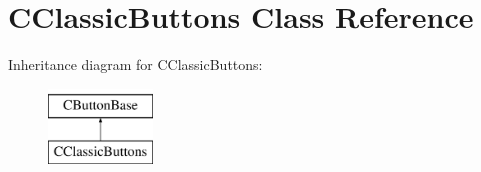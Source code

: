\hypertarget{class_c_classic_buttons}{\section{\-C\-Classic\-Buttons \-Class \-Reference}
\label{class_c_classic_buttons}
}
\-Inheritance diagram for \-C\-Classic\-Buttons\-:\begin{figure}[H]
\begin{center}
\leavevmode
\includegraphics[height=2.000000cm]{class_c_classic_buttons}
\end{center}
\end{figure}
